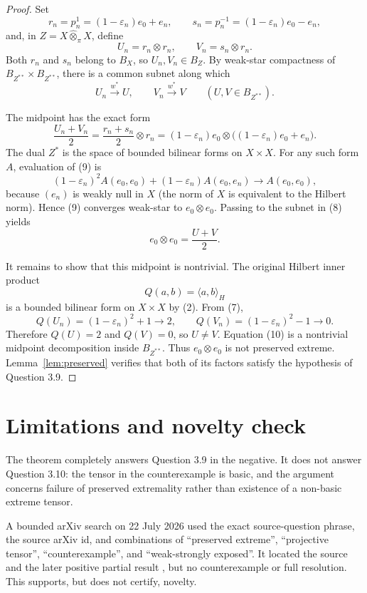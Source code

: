 \documentclass[11pt]{article}
\newcommand{\pt}{\widehat{\otimes}_{\pi}}
\begin{document}
\begin{proof}
Set
\[
 r_n=p_n^1=(1-\varepsilon_n)e_0+e_n,
 \qquad
 s_n=p_n^{-1}=(1-\varepsilon_n)e_0-e_n,
\]
and, in $Z=X\pt X$, define
\[
 U_n=r_n\otimes r_n,
 \qquad V_n=s_n\otimes r_n.
 \tag{7}
\]
Both $r_n$ and $s_n$ belong to $B_X$, so $U_n,V_n\in B_Z$.  By weak-star
compactness of $B_{Z^{**}}\times B_{Z^{**}}$, there is a common subnet along
which
\[
 U_n\overset{w^*}{\longrightarrow}U,
 \qquad V_n\overset{w^*}{\longrightarrow}V
 \qquad(U,V\in B_{Z^{**}}).
 \tag{8}
\]

The midpoint has the exact form
\[
 \frac{U_n+V_n}{2}
 =\frac{r_n+s_n}{2}\otimes r_n
 =(1-\varepsilon_n)e_0\otimes
   \bigl((1-\varepsilon_n)e_0+e_n\bigr).
 \tag{9}
\]
The dual $Z^*$ is the space of bounded bilinear forms on $X\times X$.  For
any such form $A$, evaluation of (9) is
\[
 (1-\varepsilon_n)^2A(e_0,e_0)
 +(1-\varepsilon_n)A(e_0,e_n)
 \longrightarrow A(e_0,e_0),
\]
because $(e_n)$ is weakly null in $X$ (the norm of $X$ is equivalent to the
Hilbert norm).  Hence (9) converges weak-star to $e_0\otimes e_0$.  Passing to
the subnet in (8) yields
\[
 e_0\otimes e_0=\frac{U+V}{2}.
 \tag{10}
\]

It remains to show that this midpoint is nontrivial.  The original Hilbert
inner product
\[
 Q(a,b)=\langle a,b\rangle_H
\]
is a bounded bilinear form on $X\times X$ by (2).  From (7),
\[
 Q(U_n)=(1-\varepsilon_n)^2+1\longrightarrow2,
 \qquad
 Q(V_n)=(1-\varepsilon_n)^2-1\longrightarrow0.
\]
Therefore $Q(U)=2$ and $Q(V)=0$, so $U\ne V$.  Equation (10) is a nontrivial
midpoint decomposition inside $B_{Z^{**}}$.  Thus $e_0\otimes e_0$ is not
preserved extreme.  Lemma~\ref{lem:preserved} verifies that both of its
factors satisfy the hypothesis of Question 3.9.
\end{proof}

\section{Limitations and novelty check}

The theorem completely answers Question 3.9 in the negative.  It does not
answer Question 3.10: the tensor in the counterexample is basic, and the
argument concerns failure of preserved extremality rather than existence of a
non-basic extreme tensor.

A bounded arXiv search on 22 July 2026 used the exact source-question phrase,
the source arXiv id, and combinations of ``preserved extreme'', ``projective
tensor'', ``counterexample'', and ``weak-strongly exposed''.  It located the
source and the later positive partial result \cite{APEP}, but no counterexample
or full resolution.  This supports, but does not certify, novelty.
\end{document}
